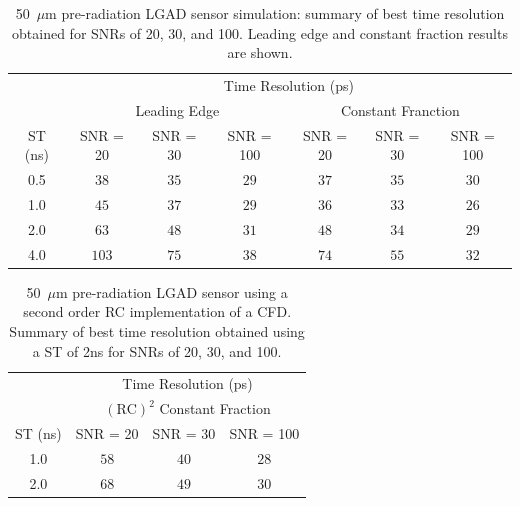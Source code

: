 \documentclass[preprint,1p]{elsarticle}
\begin{document}
\begin{table}\label{tab:shaping_time_prerad}
    \begin{tabular}{c|ccc|ccc}
    \multicolumn{1}{c}{}& \multicolumn{6}{c}{Time Resolution (ps)} \\
    \multicolumn{1}{c}{}&\multicolumn{3}{c}{Leading Edge} & \multicolumn{3}{c}{Constant Franction}\\ \hline
    ST (ns) & SNR = 20   & SNR = 30      & SNR = 100     & SNR = 20      & SNR = 30      & SNR = 100 \\
    0.5 & $38$    & $35$  & $29$  & $37$  & $35$  & $30$ \\
    1.0 & $45$    & $37$  & $29$  & $36$  & $33$  & $26$ \\
    2.0 & $63$    & $48$  & $31$  & $48$  & $34$  & $29$ \\
    4.0 & $103$  & $75$  & $38$  & $74$  & $55$  & $32$ \\
    \end{tabular}
    \caption{50~$\mu$m pre-radiation LGAD sensor simulation: summary of best time resolution obtained for SNRs
    of 20, 30, and 100. Leading edge and constant fraction results are shown.}
 \end{table}


 \begin{table}\label{tab:shaping_time_prerad_psCFD}
   \begin{center}
     \begin{tabular}{c|ccc}
     \multicolumn{1}{c}{}& \multicolumn{3}{c}{Time Resolution (ps)} \\
     \multicolumn{1}{c}{}& \multicolumn{3}{c}{$\mathrm{(RC)}^{2}$ Constant Fraction}\\ \hline
     ST (ns) & SNR = 20      & SNR = 30      & SNR = 100 \\
     1.0 & $58$  & $ 40$  & $28$ \\
     2.0 & $68$  & $ 49$  & $30$ \\     
     \end{tabular}
     \caption{50~$\mu$m pre-radiation LGAD sensor using a second order RC implementation of a CFD.
     Summary of best time resolution obtained using a ST of 2\si{ns} for SNRs of 20, 30, and 100.}
   \end{center}
  \end{table}
\end{document}

